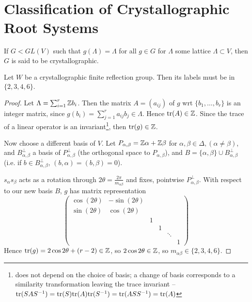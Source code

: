\section{Classification of Crystallographic Root Systems}

If $G < GL(V)$ such that $g(\Lambda) = \Lambda$ for all $g \in G$ for $\Lambda$
some lattice $\Lambda \subset V$, then $G$ is said to be crystallographic.

\begin{lemma} \label{cor19}
Let $W$ be a crystallographic finite reflection group. Then its labels must be
in $\{2, 3, 4, 6\}$.
\end{lemma}

\begin{proof}
Let $\Lambda = \sum_{i=1}^r \mathbb{Z} b_i$. Then the matrix $A = (a_{ij})$ of $g$ wrt
$\{b_1, \dots, b_r\}$ is an integer matrix, since $g(b_i) = \sum_{j=1}^r
a_{ij} b_j \in \Lambda$.
Hence ${\rm tr} (A) \in \mathbb{Z}$.
Since the trace of a linear operator is an invariant\footnote{does not depend
on the choice of basis; a change of basis corresponds to a similarity transformation
leaving the trace invariant -- ${\rm tr}(SAS^{-1}) = {\rm tr}(S){\rm tr}(A)
{\rm tr}(S^{-1}) = {\rm tr}(ASS^{-1}) = {\rm tr}(A)$}, then ${\rm tr}(g) \in \mathbb{Z}$.

Now choose a different basis of $V$. Let $P_{\alpha, \beta} = \mathbb{Z} \alpha +
\mathbb{Z} \beta$ for $\alpha, \beta \in \Delta, (\alpha \neq \beta)$, and
$B_{\alpha,\beta}^\perp$ a basis of $P_{\alpha, \beta}^\perp$ (the orthogonal
space to $P_{\alpha, \beta}$), and $B = \{\alpha, \beta\} \cup
B_{\alpha,\beta}^\perp$ (i.e. if $b \in B_{\alpha, \beta}^\perp$, $(b, \alpha)
= (b, \beta) = 0$).

$s_\alpha s_\beta$ acts as a rotation through $2\theta =
\frac{2\pi}{m_{\alpha \beta}}$ and fixes, pointwise $P_{\alpha, \beta}^\perp$.
With respect to our new basis $B$, $g$ has matrix representation
\[
    \begin{pmatrix}
        \cos (2\theta) & -\sin(2\theta) \\
        \sin (2\theta) & \cos(2\theta) \\
        & & 1 \\
        & & & 1 \\
        & & & & \ddots \\
        & & & & & 1
    \end{pmatrix}
\]
Hence ${\rm tr}(g) = 2 \cos 2\theta + (r-2) \in \mathbb{Z}$, so $2 \cos 2\theta \in \mathbb{Z}$,
so $m_{\alpha \beta} \in \{2,3,4,6\}$.
\end{proof}

